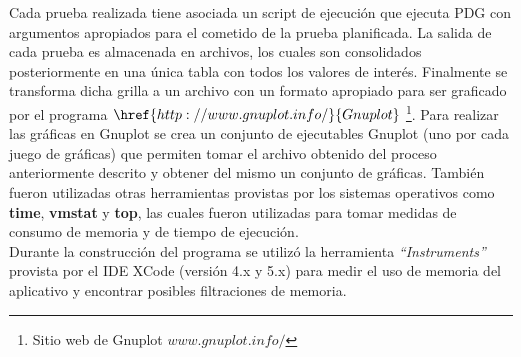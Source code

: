 Cada prueba realizada tiene asociada un script de ejecución que ejecuta PDG con argumentos apropiados para el cometido de la prueba planificada. La salida de cada prueba es almacenada en archivos, los cuales son consolidados posteriormente en una única tabla con todos los valores de interés. Finalmente se transforma dicha grilla a un archivo con un formato apropiado para ser graficado por el programa $\href{http://www.gnuplot.info/}{Gnuplot}$ \footnote{ Sitio web de Gnuplot $www.gnuplot.info/$}. Para realizar las gráficas en Gnuplot se crea un conjunto de ejecutables Gnuplot (uno por cada juego de gráficas) que permiten tomar el archivo obtenido del proceso anteriormente descrito y obtener del mismo un conjunto de gráficas. También fueron utilizadas otras herramientas provistas por los sistemas operativos como {\bf time}, {\bf vmstat} y {\bf top}, las cuales fueron utilizadas para tomar medidas de consumo de memoria y de tiempo de ejecución.\\
Durante la construcción del programa se utilizó la herramienta {\it “Instruments”} provista por el IDE XCode (versión 4.x y 5.x) para medir el uso de memoria del aplicativo y encontrar posibles filtraciones de memoria.
